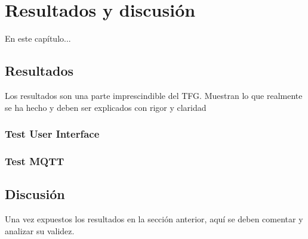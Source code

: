 \chapter{Resultados y discusión}

En este capítulo...


\section{Resultados}

Los resultados son una parte imprescindible del TFG. Muestran lo que realmente se ha hecho y deben ser explicados con rigor y claridad

\subsection{Test User Interface}

\subsection{Test MQTT}


\section{Discusión}

Una vez expuestos los resultados en la sección anterior, aquí se deben comentar y analizar su validez.
